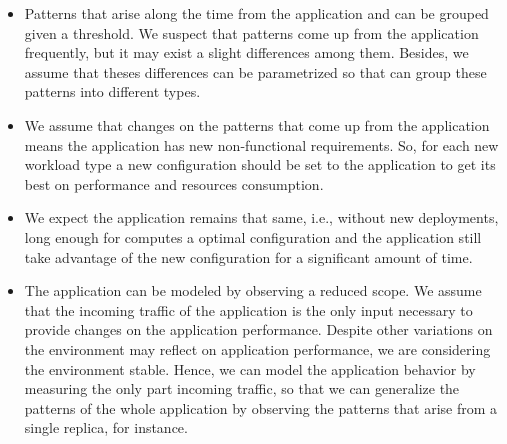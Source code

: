 \begin{itemize}
\item Patterns that arise along the time from the application and can be grouped given a threshold. We suspect that
  patterns come up from the application frequently, but it may exist a slight differences among them. Besides, we
    assume that theses differences can be parametrized so that \name can group these patterns into different types.

\item We assume that changes on the patterns that come up from the application means the application has new
  non-functional requirements. So, for each new workload type a new configuration should be set to the application to
    get its best on performance and resources consumption.

\item We expect the application remains that same, i.e., without new deployments, long enough for \name computes a
  optimal configuration and the application still take advantage of the new configuration for a significant amount of
    time.

\item The application can be modeled by observing a reduced scope. We assume that the incoming traffic of the
  application is the only input necessary to provide changes on the application performance. Despite other variations
    on the environment may reflect on application performance, we are considering the environment stable. Hence, we can
    model the application behavior by measuring the only part incoming traffic, so that we can generalize the patterns
    of the whole application by observing the patterns that arise from a single replica, for instance.

\end{itemize}

